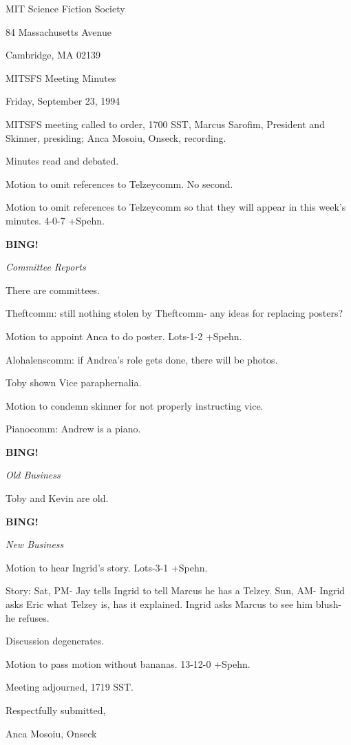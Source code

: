 \documentclass[12pt]{article}
\newcommand{\bing}{{\bf BING!} }
\newcommand{\goto}[1]{\bing \vskip 12pt \centerline{{\em{#1}}}}
\begin{document}
\begin{center}

MIT Science Fiction Society 

84 Massachusetts Avenue

Cambridge, MA 02139

\vspace{12pt}

MITSFS Meeting Minutes 

Friday, September 23, 1994

\end{center}
 
\vspace{18pt}

\setlength{\parskip}{6pt}

\noindent
MITSFS meeting called to order, 1700 SST,
Marcus Sarofim, President and Skinner, presiding; Anca Mosoiu, Onseck, recording.

Minutes read and debated.

Motion to omit references to Telzeycomm. No second.

Motion to omit references to Telzeycomm so that they will appear in this week's minutes. 4-0-7 +Spehn.

\goto{Committee Reports}

There are committees.

Theftcomm: still nothing stolen by Theftcomm- any ideas for replacing posters?

Motion to appoint Anca to do poster. Lots-1-2 +Spehn.

Alohalenscomm: if Andrea's role gets done, there will be photos.

Toby shown Vice paraphernalia.

Motion to condemn skinner for not properly instructing vice.

Pianocomm: Andrew is a piano.

\goto{Old Business}

Toby and Kevin are old.

\goto{New Business}

Motion to hear Ingrid's story. Lots-3-1 +Spehn.

Story: Sat, PM- Jay tells Ingrid to tell Marcus he has a Telzey. Sun, AM- Ingrid asks Eric what Telzey is, has it explained. Ingrid asks Marcus to see him blush- he refuses.

Discussion degenerates.

Motion to pass motion without bananas. 13-12-0 +Spehn.

\vspace{12pt}

\noindent
Meeting adjourned, 1719 SST.

\vspace{18pt}

\centerline{Respectfully submitted,}
\centerline{Anca Mosoiu, Onseck}
\end{document}
